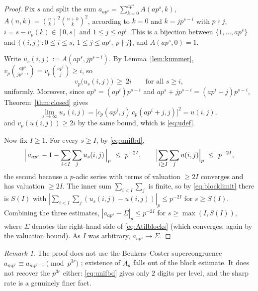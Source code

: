\documentclass[11pt,reqno]{article}
\newcommand{\Atil}{\widetilde{A}}
\newcommand{\vp}{v_p}
\newcommand{\bin}[2]{\binom{#1}{#2}}
\theoremstyle{plain}
\theoremstyle{definition}
\theoremstyle{remark}
\newtheorem{remark}[theorem]{Remark}
\numberwithin{equation}{section}
\begin{document}
\begin{proof}
Fix $s$ and split the sum $a_{ap^s}=\sum_{k=0}^{ap^s}A(ap^s,k)$,
$A(n,k)=\bin nk^2\bin{n+k}k^2$, according to $k=0$ and $k=jp^{s-i}$ with
$p\nmid j$, $i=s-\vp(k)\in[0,s]$ and $1\le j\le ap^{i}$.  This is a bijection
between $\{1,\dots,ap^s\}$ and $\{(i,j):0\le i\le s,\ 1\le j\le ap^i,\
p\nmid j\}$, and $A(ap^s,0)=1$.

Write $u_s(i,j):=A(ap^s,jp^{s-i})$.  By Lemma~\ref{lem:kummer},
$\vp\bin{ap^s}{jp^{s-i}}=\vp\bin{ap^i}{j}\ge i$, so
\begin{equation}\label{eq:unifbd}
  \vp\bigl(u_s(i,j)\bigr)\ \ge\ 2i\qquad\text{for all }s\ge i,
\end{equation}
uniformly.  Moreover, since $ap^s=(ap^i)p^{s-i}$ and
$ap^s+jp^{s-i}=(ap^i+j)p^{s-i}$, Theorem~\ref{thm:closed} gives
\begin{equation}\label{eq:blocklimit}
  \lim_{s\to\infty}u_s(i,j)
  =\bigl[c_p(ap^i,j)\,c_p(ap^i+j,j)\bigr]^{2}=u(i,j),
\end{equation}
and $\vp(u(i,j))\ge2i$ by the same bound, which is \eqref{eq:udef}.

Now fix $I\ge1$.  For every $s\ge I$, by \eqref{eq:unifbd},
\[
  \Bigl|\,a_{ap^s}-1-\sum_{i<I}\sum_ju_s(i,j)\,\Bigr|_p\ \le\ p^{-2I},
  \qquad
  \Bigl|\sum_{i\ge I}\sum_ju(i,j)\Bigr|_p\ \le\ p^{-2I},
\]
the second because a $p$-adic series with terms of valuation $\ge2I$ converges
and has valuation $\ge2I$.  The inner sum $\sum_{i<I}\sum_j$ is finite, so by
\eqref{eq:blocklimit} there is $S(I)$ with
$|\sum_{i<I}\sum_j(u_s(i,j)-u(i,j))|_p\le p^{-2I}$ for $s\ge S(I)$.  Combining
the three estimates, $|a_{ap^s}-\Sigma|_p\le p^{-2I}$ for $s\ge\max(I,S(I))$,
where $\Sigma$ denotes the right-hand side of \eqref{eq:Atilblocks} (which
converges, again by the valuation bound).  As $I$ was arbitrary, $a_{ap^s}\to
\Sigma$.
\end{proof}

\begin{remark}
The proof does not use the Beukers--Coster supercongruence
$a_{mp^r}\equiv a_{mp^{r-1}}\pmod{p^{3r}}$ \cite{Supercong}; existence of
$\Atil_a$ falls out of the block estimate.  It does not recover the $p^{3r}$
either: \eqref{eq:unifbd} gives only $2$ digits per level, and the sharp rate is
a genuinely finer fact.
\end{remark}
\end{document}
